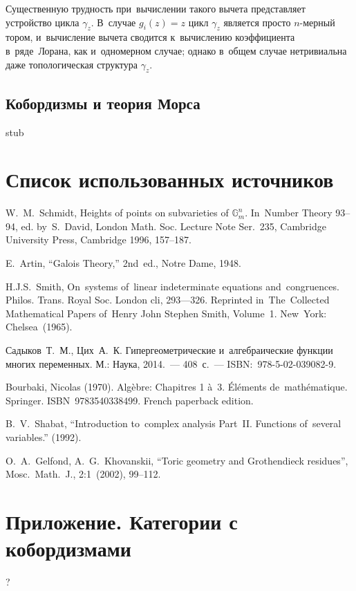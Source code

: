 \documentclass{article}
\begin{document}
Существенную трудность при~вычислении такого вычета представляет устройство цикла $\gamma_z$.
В~случае $g_i(z) = z$ цикл $\gamma_z$ является просто $n$-мерный тором, и~вычисление вычета
сводится к~вычислению коэффициента в~ряде~Лорана, как и~одномерном случае; однако в~общем случае
нетривиальна даже топологическая структура $\gamma_z$.

\subsection{Кобордизмы и теория Морса}

stub

\pagebreak

\titleformat{\section}{\centering\normalfont\Large\bfseries}{}{0em}{}
\section{Список использованных источников}

\begin{thebibliography}{9}

 W.~M.~Schmidt, Heights of points on subvarieties of $\mathbb{G}^n_m$.
In~Number Theory 93–94, ed. by~S.~David, London Math. Soc. Lecture Note Ser.~235,
Cambridge University Press, Cambridge 1996, 157–187.

 E.~Artin, “Galois Theory,” 2nd~ed., Notre Dame, 1948.

 H.J.S.~Smith, On~systems of~linear indeterminate equations and~congruences. Philos. Trans. Royal
Soc. London cli, 293—326. Reprinted in~The~Collected Mathematical Papers of~Henry John Stephen Smith,
Volume~1. New~York: Chelsea~(1965).

 Садыков~Т.~М., Цих~А.~К. Гипергеометрические и~алгебраические функции многих переменных.
М.: Наука, 2014.~— 408 с.~— ISBN: 978-5-02-039082-9.

 Bourbaki, Nicolas (1970). Algèbre: Chapitres 1 à~3. Éléments de~mathématique. Springer. ISBN~9783540338499. French paperback edition.

 B.~V.~Shabat, “Introduction to~complex analysis Part~II. Functions of~several variables.” (1992).

 O.~A.~Gelfond, A.~G.~Khovanskii, “Toric geometry and Grothendieck residues”, Mosc.~Math.~J., 2:1~(2002), 99–112.

\end{thebibliography}
\pagebreak

\section{Приложение. Категории с кобордизмами}

?

\pagebreak
\end{document}
